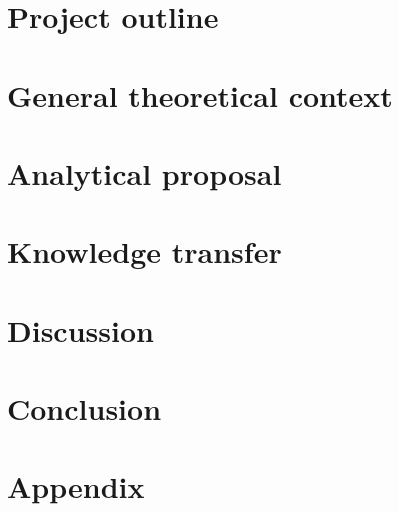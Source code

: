 \documentclass[12pt]{article}
\begin{document}
\section{Project outline}
\label{project}


\section{General theoretical context}
\label{theory}


\section{Analytical proposal}
\label{analysis}


\section{Knowledge transfer}
\label{teaching}


\section{Discussion}
\label{discussion}


\section{Conclusion}
\label{conclusion}


\newpage

    


\setcounter{page}{5}

\appendix

\section{Appendix}
\label{app}
% 
\newpage
\end{document}
